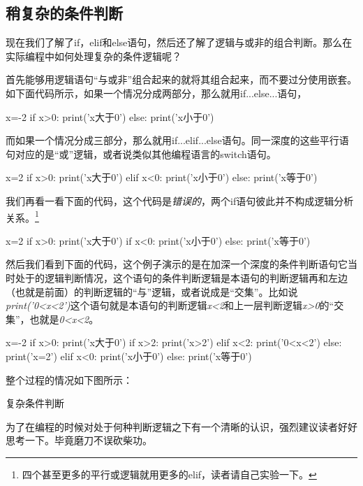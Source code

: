 \documentclass[12pt,oneside]{book}
\begin{document}
\begin{common-format}
\subsection{稍复杂的条件判断}
现在我们了解了if，elif和else语句，然后还了解了逻辑与或非的组合判断。那么在实际编程中如何处理复杂的条件逻辑呢？

首先能够用逻辑语句“与或非”组合起来的就将其组合起来，而不要过分使用嵌套。如下面代码所示，如果一个情况分成两部分，那么就用if...else...语句，
\begin{tcbpython}[]
x=-2
if x>0:
    print('x大于0')
else:
    print('x小于0')
\end{tcbpython}

而如果一个情况分成三部分，那么就用if...elif...else语句。同一深度的这些平行语句对应的是“或”逻辑，或者说类似其他编程语言的switch语句。
\begin{tcbpython}
x=2
if x>0:
    print('x大于0')
elif x<0:
    print('x小于0')
else:
    print('x等于0')
\end{tcbpython}

我们再看一看下面的代码，这个代码是\emph{错误的}，两个if语句彼此并不构成逻辑分析关系。\footnote{四个甚至更多的平行或逻辑就用更多的elif，读者请自己实验一下。}
\begin{tcbpython}
x=2
if x>0:
    print('x大于0')
if x<0:
    print('x小于0')
else:
    print('x等于0')
\end{tcbpython}


然后我们看到下面的代码，这个例子演示的是在加深一个深度的条件判断语句它当时处于的逻辑判断情况，这个语句的条件判断逻辑是本语句的判断逻辑再和左边（也就是前面）的判断逻辑的“与”逻辑，或者说成是“交集”。比如说\textit{print('0<x<2')}这个语句就是本语句的判断逻辑\textit{x<2}和上一层判断逻辑\textit{x>0}的“交集”，也就是\textit{0<x<2}。

\begin{tcbpython}
x=-2
if x>0:
    print('x大于0')
    if x>2:
        print('x>2')
    elif x<2:
        print('0<x<2')
    else:
        print('x=2')
elif x<0:
    print('x小于0')
else:
    print('x等于0')
\end{tcbpython}


整个过程的情况如下图所示：
\begin{linefig}{复杂条件判断}
\caption{复杂条件判断}
\label{fig:复杂条件判断}
\end{linefig}
为了在编程的时候对处于何种判断逻辑之下有一个清晰的认识，强烈建议读者好好思考一下。毕竟磨刀不误砍柴功。



\end{common-format}
\end{document}
